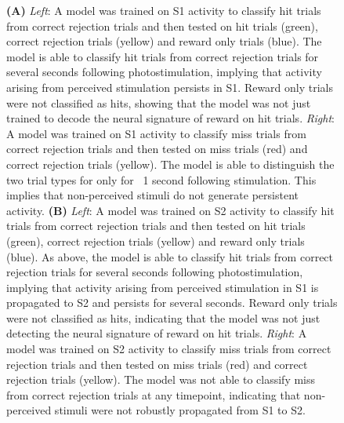 \begin{figure}[h]
{\textbf{(A)} \textit{Left}: A model was trained on S1 activity to classify hit trials from correct rejection trials and then tested on hit trials (green), correct rejection trials (yellow) and reward only trials (blue). The model is able to classify hit trials from correct rejection trials for several seconds following photostimulation, implying that activity arising from perceived stimulation persists in S1. Reward only trials were not classified as hits, showing that the model was not just trained to decode the neural signature of reward on hit trials. \textit{Right}: A model was trained on S1 activity to classify miss trials from correct rejection trials and then tested on miss trials (red) and correct rejection trials (yellow). The model is able to distinguish the two trial types for only for ~1 second following stimulation. This implies that non-perceived stimuli do not generate persistent activity. \textbf{(B)} \textit{Left}: A model was trained on S2 activity to classify hit trials from correct rejection trials and then tested on hit trials (green), correct rejection trials (yellow) and reward only trials (blue). As above, the model is able to classify hit trials from correct rejection trials for several seconds following photostimulation, implying that activity arising from perceived stimulation in S1 is propagated to S2 and persists for several seconds. Reward only trials were not classified as hits, indicating that the model was not just detecting the neural signature of reward on hit trials. \textit{Right}: A model was trained on S2 activity to classify miss trials from correct rejection trials and then tested on miss trials (red) and correct rejection trials (yellow). The model was not able to classify miss from correct rejection trials at any timepoint, indicating that non-perceived stimuli were not robustly propagated from S1 to S2.





} 
\label{fig:fig3}
\end{figure}








